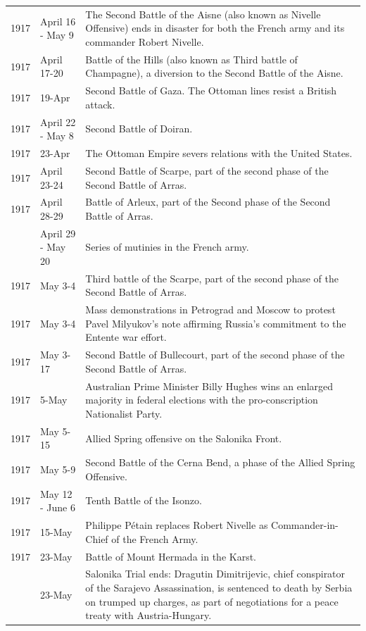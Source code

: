 \documentclass[
  openany]{book}
\begin{document}
\begin{longtable}[t]{rl>{\raggedright\arraybackslash}p{22em}}
\rowcolor{gray!6}  1917 & April 16 - May 9 & The Second Battle of the Aisne (also known as Nivelle Offensive) ends in disaster for both the French army and its commander Robert Nivelle.\\
1917 & April 17-20 & Battle of the Hills (also known as Third battle of Champagne), a diversion to the Second Battle of the Aisne.\\
\addlinespace
\rowcolor{gray!6}  1917 & 19-Apr & Second Battle of Gaza. The Ottoman lines resist a British attack.\\
1917 & April 22 - May 8 & Second Battle of Doiran.\\
\rowcolor{gray!6}  1917 & 23-Apr & The Ottoman Empire severs relations with the United States.\\
1917 & April 23-24 & Second Battle of Scarpe, part of the second phase of the Second Battle of Arras.\\
\rowcolor{gray!6}  1917 & April 28-29 & Battle of Arleux, part of the Second phase of the Second Battle of Arras.\\
\addlinespace
1917 & April 29 - May 20 & Series of mutinies in the French army.\\
\rowcolor{gray!6}  1917 & May 3-4 & Third battle of the Scarpe, part of the second phase of the Second Battle of Arras.\\
1917 & May 3-4 & Mass demonstrations in Petrograd and Moscow to protest Pavel Milyukov's note affirming Russia's commitment to the Entente war effort.\\
\rowcolor{gray!6}  1917 & May 3-17 & Second Battle of Bullecourt, part of the second phase of the Second Battle of Arras.\\
1917 & 5-May & Australian Prime Minister Billy Hughes wins an enlarged majority in federal elections with the pro-conscription Nationalist Party.\\
\addlinespace
\rowcolor{gray!6}  1917 & May 5-15 & Allied Spring offensive on the Salonika Front.\\
1917 & May 5-9 & Second Battle of the Cerna Bend, a phase of the Allied Spring Offensive.\\
\rowcolor{gray!6}  1917 & May 12 - June 6 & Tenth Battle of the Isonzo.\\
1917 & 15-May & Philippe Pétain replaces Robert Nivelle as Commander-in-Chief of the French Army.\\
\rowcolor{gray!6}  1917 & 23-May & Battle of Mount Hermada in the Karst.\\
\addlinespace
1917 & 23-May & Salonika Trial ends: Dragutin Dimitrijevic, chief conspirator of the Sarajevo Assassination, is sentenced to death by Serbia on trumped up charges, as part of negotiations for a peace treaty with Austria-Hungary.\\

\end{longtable}
\end{document}
